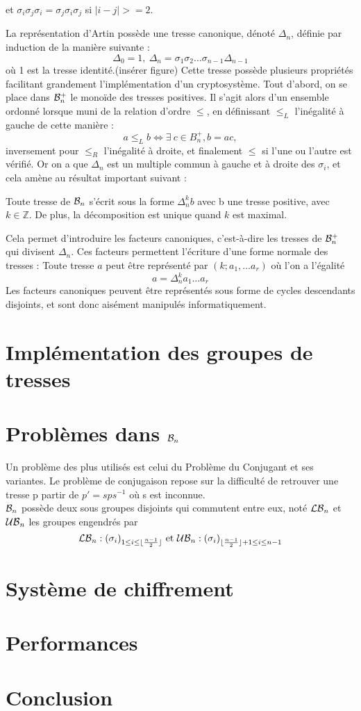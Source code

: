 \documentclass[a4paper,100pt]{article}
\begin{document}
et $\sigma_i\sigma_j\sigma_i = \sigma_j\sigma_i\sigma_j$ si $|i-j| >= 2$.

La représentation d'Artin possède une tresse canonique, dénoté $\Delta_n$, définie par induction de la manière suivante :
\[\Delta_0 = 1,\ \Delta_n = \sigma_1\sigma_2\dots\sigma_{n-1}\Delta_{n-1}\] où 1 est la tresse identité.(insérer figure)
Cette tresse possède plusieurs propriétés facilitant grandement l'implémentation d'un cryptosystème. Tout d'abord, on se place dans $\mathcal{B}_n^+$ le monoïde des tresses positives. Il s'agit alors d'un ensemble ordonné lorsque muni de la relation d'ordre $\leq$, en définissant $\leq_L$ l'inégalité à gauche de cette manière : \[a \leq_L b \Leftrightarrow \exists \ c \in B_n^+, b = ac,\] inversement pour $\leq_R$ l'inégalité à droite, et finalement $\leq$ si l'une ou l'autre est vérifié.
Or on a que $\Delta_n$ est un multiple commun à gauche et à droite des $\sigma_i$, et cela amène au résultat important suivant :

Toute tresse de $\mathcal{B}_n$ s'écrit sous la forme $\Delta_n^{k}b$ avec b une tresse positive, avec $k\in\mathbb{Z}$. De plus, la décomposition est unique quand $k$ est maximal.

Cela permet d'introduire les facteurs canoniques, c'est-à-dire les tresses de $\mathcal{B}_n^+$ qui divisent $\Delta_n$. Ces facteurs permettent l'écriture d'une forme normale des tresses : Toute tresse $a$ peut être représenté par $(k;a_1,\dots a_r)$ où l'on a l'égalité \[a = \Delta_n^ka_1\dots a_r\]
Les facteurs canoniques peuvent être représentés sous forme de cycles descendants disjoints, et sont donc aisément manipulés informatiquement.

\section{Implémentation des groupes de tresses}
\section{Problèmes dans $\mathcal{B}_n$}
Un problème des plus utilisés est celui du Problème du Conjugant et ses variantes. Le problème de conjugaison repose sur la difficulté de retrouver une tresse p  partir de $p' = sps^{-1}$ où s est inconnue.\\
$\mathcal{B}_n$ possède deux sous groupes disjoints qui commutent entre eux, noté $\mathcal{LB}_n $ et $\mathcal{UB}_n $ les groupes engendrés par
\[\mathcal{LB}_n : (\sigma_i)_{1\le i\le \lfloor {\frac {n-1}{2}}\rfloor}\text{ et }
\mathcal{UB}_n : (\sigma_i)_{\lfloor \frac {n-1}{2}\rfloor + 1 \leq i\leq n-1}
\]










\section{Système de chiffrement}
\section{Performances}
\section{Conclusion}
\end{document}
